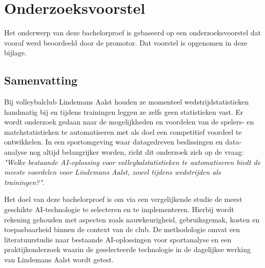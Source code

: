\documentclass[dutch,dit,thesis]{hogentreport}
\begin{document}





%
%








\appendix

\chapter{Onderzoeksvoorstel}

Het onderwerp van deze bachelorproef is gebaseerd op een onderzoeksvoorstel dat vooraf werd beoordeeld door de promotor. Dat voorstel is opgenomen in deze bijlage.

\section{Samenvatting}

Bij volleybalclub Lindemans Aalst houden ze momenteel wedstrijdstatistieken handmatig bij en tijdens trainingen leggen ze zelfs geen statistieken vast. Er wordt onderzoek gedaan naar de mogelijkheden en voordelen van de spelers- en matchstatistieken te automatiseren met als doel een competitief voordeel te ontwikkelen. In een sportomgeving waar datagedreven beslissingen en data-analyse nog altijd belangrijker worden, richt dit onderzoek zich op de vraag: \textit{"Welke bestaande AI-oplossing voor volleybalstatistieken te automatiseren biedt de meeste voordelen voor Lindemans Aalst, zowel tijdens wedstrijden als trainingen?"}.
  
Het doel van deze bachelorproef is om via een vergelijkende studie de meest geschikte AI-technologie te selecteren en te implementeren. Hierbij wordt rekening gehouden met aspecten zoals nauwkeurigheid, gebruiksgemak, kosten en toepasbaarheid binnen de context van de club. De methodologie omvat een literatuurstudie naar bestaande AI-oplossingen voor sportanalyse en een praktijkonderzoek waarin de geselecteerde technologie in de dagelijkse werking van Lindemans Aalst wordt getest.
\end{document}
